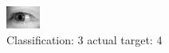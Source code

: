 \begin{figure}[h!]
\begin{center}
\includegraphics[width=0.60\columnwidth]{figures/ID3167_class_3_target_4.png}
\end{center}
\caption{ Classification: 3 actual target: 4}
\label{fig:ID3167_class_3_target_4}
\end{figure}
